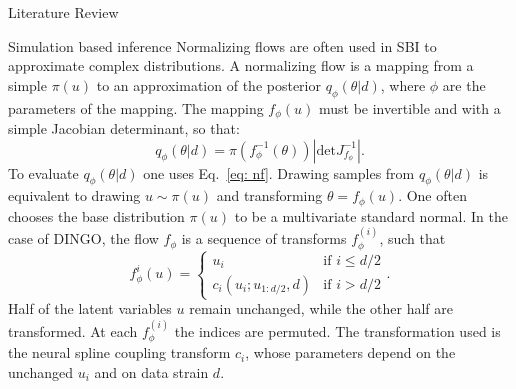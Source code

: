 \documentclass[11pt,a4paper,oneside]{book}
\numberwithin{equation}{chapter}
\numberwithin{table}{chapter}
\numberwithin{figure}{chapter}
\begin{document}
\begin{chapter}{Literature Review}
\begin{section}{Simulation based inference}
Normalizing flows are often used in SBI to approximate complex distributions.
A normalizing flow is a mapping from a simple $\pi(u)$ to an approximation of the posterior $q_{\phi}(\theta|d)$, where $\phi$ are the parameters of the mapping. 
The mapping $f_{\phi}(u)$ must be invertible and with a simple Jacobian determinant, so that:
\begin{equation}
\label{eq: nf}
q_{\phi}(\theta|d) = \pi(f_{\phi}^{-1}(\theta))\left|\textrm{det}J_{f_{\phi}}^{-1}\right|.
\end{equation}
To evaluate $q_{\phi}(\theta|d)$ one uses Eq.~\ref{eq: nf}. Drawing samples from $q_{\phi}(\theta|d)$ is equivalent to drawing $u\sim\pi(u)$ and transforming $\theta=f_{\phi}(u)$.
One often chooses the base distribution $\pi(u)$ to be a multivariate standard normal.
In the case of DINGO, the flow $f_{\phi}$ is a sequence of transforms $f_{\phi}^{(i)}$, such that
\begin{equation}
f_{\phi}^{i}(u) = 
\begin{cases}
u_{i} & \text{if } i\leq d/2 \\
c_{i}(u_{i}; u_{1:{d/2}},d) & \text{if } i> d/2
\end{cases}.
\end{equation}
Half of the latent variables $u$ remain unchanged, while the other half are transformed.
At each $f_{\phi}^{(i)}$ the indices are permuted.
The transformation used is the neural spline coupling transform $c_{i}$, whose parameters depend on the unchanged $u_{i}$ and on data strain $d$.


\end{section}
\end{chapter}
\end{document}
